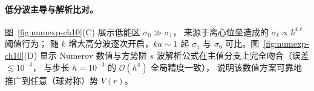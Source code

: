 \paragraph{低分波主导与解析比对。}
图~\ref{fig:numexp-ch10}(C) 展示低能区 $\sigma_0\gg\sigma_1$，
来源于离心位垒造成的 $\sigma_\ell\propto k^{4\ell}$ 阈值行为；
随 $k$ 增大高分波逐次开启，$ka\sim 1$ 起 $\sigma_1$ 与 $\sigma_0$
可比。图~\ref{fig:numexp-ch10}(D) 显示 Numerov 数值与方势阱
$s$ 波解析公式在主值分支上完全吻合（误差 $\lesssim 10^{-3}$，
与步长 $h=10^{-3}$ 的 $\mathcal O(h^4)$ 全局精度一致），
说明该数值方案可靠地推广到任意（球对称）势 $V(r)$。
